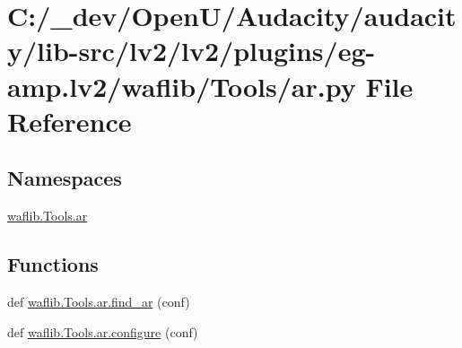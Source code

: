 \hypertarget{lv2_2plugins_2eg-amp_8lv2_2waflib_2_tools_2ar_8py}{}\section{C\+:/\+\_\+dev/\+Open\+U/\+Audacity/audacity/lib-\/src/lv2/lv2/plugins/eg-\/amp.lv2/waflib/\+Tools/ar.py File Reference}
\label{lv2_2plugins_2eg-amp_8lv2_2waflib_2_tools_2ar_8py}
\subsection*{Namespaces}
\begin{DoxyCompactItemize}
\item 
 \hyperlink{namespacewaflib_1_1_tools_1_1ar}{waflib.\+Tools.\+ar}
\end{DoxyCompactItemize}
\subsection*{Functions}
\begin{DoxyCompactItemize}
\item 
def \hyperlink{namespacewaflib_1_1_tools_1_1ar_ade578f6e88784a6a5524a2ff2333096b}{waflib.\+Tools.\+ar.\+find\+\_\+ar} (conf)
\item 
def \hyperlink{namespacewaflib_1_1_tools_1_1ar_adac714580d14727514e133de54b6c0b3}{waflib.\+Tools.\+ar.\+configure} (conf)
\end{DoxyCompactItemize}
